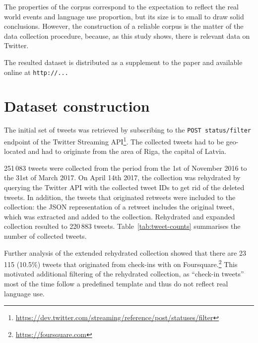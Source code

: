 \documentclass[11pt,a4paper]{article}
\begin{document}
The properties of the corpus correspond to the expectation to reflect the real world events and language use proportion, but its size is to small to draw solid conclusions. However, the construction of a reliable corpus is the matter of the data collection procedure, because, as this study shows, there is relevant data on Twitter.

The resulted dataset is distributed as a supplement to the paper and available online at \texttt{http://...}

\section{Dataset construction}
\label{sec:construction}



The initial set of tweets was retrieved by subscribing to the \texttt{POST status/filter} endpoint of the Twitter Streaming API\footnote{\url{https://dev.twitter.com/streaming/reference/post/statuses/filter}}.
The collected tweets had to be geo-located and had to originate from the area of Riga, the capital of Latvia.\footnotemark{}


251\,083 tweets were collected from the period from the 1st of November 2016 to the 31st of March 2017. On April 14th 2017, the collection was rehydrated by querying the Twitter API with the collected tweet IDs to get rid of the deleted tweets. In addition, the tweets that originated retweets were included to the collection: the JSON representation of a retweet includes the original tweet, which was extracted and added to the collection. Rehydrated and expanded collection resulted to 220\,883 tweets. Table~\ref{tab:tweet-counts} summarises the number of collected tweets. 



Further analysis of the extended rehydrated collection showed that there are 23\,115 (10.5\%) tweets that originated from check-ins with on Foursquare.\footnote{\url{https://foursquare.com}} This motivated additional filtering of the rehydrated collection, as ``check-in tweets'' most of the time follow a predefined template and thus do not reflect real language use. 


\end{document}
